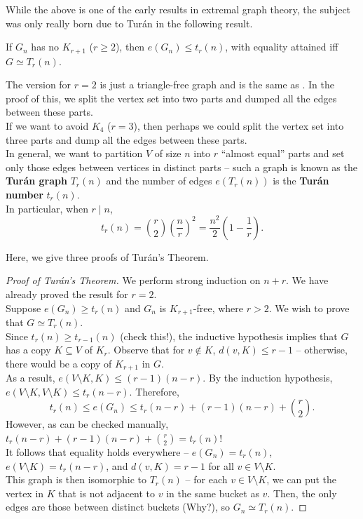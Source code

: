 \documentclass{article}
\begin{document}
		While the above is one of the early results in extremal graph theory, the subject was only really born due to Tur\'{a}n in the following result.

		\begin{ftheo}
			If $G_n$ has no $K_{r+1}$ ($r \ge 2$), then $e(G_n) \le t_r(n)$, with equality attained iff $G \simeq T_r(n)$.
		\end{ftheo}

		The version for $r=2$ is just a triangle-free graph and is the same as . In the proof of this, we split the vertex set into two parts and dumped all the edges between these parts.\\
		If we want to avoid $K_4$ ($r=3$), then perhaps we could split the vertex set into three parts and dump all the edges between these parts.\\
		In general, we want to partition $V$ of size $n$ into $r$ ``almost equal'' parts and set only those edges between vertices in distinct parts -- such a graph is known as the \textbf{Tur\'{a}n graph} $T_r(n)$ and the number of edges $e(T_r(n))$ is the \textbf{Tur\'{a}n number} $t_r(n)$.\\
		In particular, when $r \mid n$,
		\[ t_r(n) = \binom{r}{2} \left(\frac{n}{r}\right)^2 = \frac{n^2}{2} \left(1 - \frac{1}{r}\right). \]


		Here, we give three proofs of Tur\'{a}n's Theorem.

		\begin{proof}[Proof of Tur\'{a}n's Theorem]
			We perform strong induction on $n+r$. We have already proved the result for $r=2$.\\
			Suppose $e(G_n) \ge t_r(n)$ and $G_n$ is $K_{r+1}$-free, where $r > 2$. We wish to prove that $G \simeq T_r(n)$.\\
			Since $t_r(n) \ge t_{r-1}(n)$ (check this!), the inductive hypothesis implies that $G$ has a copy $K \subseteq V$ of $K_r$. Observe that for $v \not\in K$, $d(v,K) \le r-1$ -- otherwise, there would be a copy of $K_{r+1}$ in $G$.\\
			As a result, $e(V \setminus K, K) \le (r-1)(n-r)$. By the induction hypothesis, $e(V\setminus K, V\setminus K) \le t_r(n-r)$. Therefore,
			\[ t_r(n) \le e(G_n) \le t_r(n-r) + (r-1)(n-r) + \binom{r}{2}. \]
			However, as can be checked manually, $t_r(n-r) + (r-1)(n-r) + \binom{r}{2} = t_r(n)$!\\
			It follows that equality holds everywhere -- $e(G_n) = t_r(n)$, $e(V \setminus K) = t_r(n-r)$, and $d(v,K) = r-1$ for all $v \in V \setminus K$.\\
			This graph is then isomorphic to $T_r(n)$ -- for each $v \in V \setminus K$, we can put the vertex in $K$ that is not adjacent to $v$ in the same bucket as $v$. Then, the only edges are those between distinct buckets (Why?), so $G_n \simeq T_r(n)$.
		\end{proof}
\end{document}
